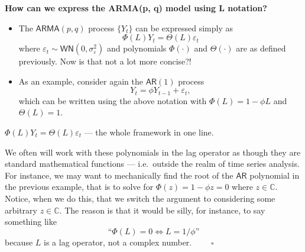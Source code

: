 \documentclass[
  letterpaper,
  DIV=11,
  numbers=noendperiod]{scrartcl}
\newcommand{\slidelabel}[1]{{\color{embernavy}\bfseries\large #1\par\vspace{5pt}}}
\newenvironment{slidefooter}{%
  \par\vspace{7pt}{\color{emberrule}\rule{\linewidth}{0.4pt}}\par\vspace{4pt}%
  \color{emberamber}\itshape\small}{\par}
\begin{document}
\begin{slidebox}

\slidelabel{How can we express the ARMA(p, q) model using L notation?}

\begin{itemize}
\item
  The \(\mathsf{ARMA}(p, q)\) process \(\{Y_t\}\) can be expressed
  simply as \[\Phi(L) Y_t = \Theta(L)\varepsilon_t\] where
  \(\varepsilon_t \sim \mathsf{WN}\left(0, \sigma_\varepsilon^2\right)\)
  and polynomials \(\Phi(\cdot)\) and \(\Theta(\cdot)\) are as defined
  previously. Now is that not a lot more concise?!
\item
  As an example, consider again the \(\mathsf{AR}(1)\) process
  \[Y_t = \phi Y_{t-1} + \varepsilon_t,\] which can be written using the
  above notation with \(\Phi(L) = 1 - \phi L\) and \(\Theta(L) = 1\).
\end{itemize}

\begin{slidefooter}

\(\Phi(L) Y_t = \Theta(L)\varepsilon_t\) --- the whole framework in one
line.

\end{slidefooter}

\end{slidebox}

\begin{tcolorbox}[enhanced jigsaw, arc=.35mm, bottomrule=.15mm, bottomtitle=1mm, breakable, colback=white, colbacktitle=quarto-callout-note-color!10!white, colframe=quarto-callout-note-color-frame, coltitle=black, left=2mm, leftrule=.75mm, opacityback=0, opacitybacktitle=0.6, rightrule=.15mm, title=\textcolor{quarto-callout-note-color}{\faInfo}\hspace{0.5em}{Remark}, titlerule=0mm, toprule=.15mm, toptitle=1mm]

We often will work with these polynomials in the lag operator as though
they are standard mathematical functions --- i.e.~outside the realm of
time series analysis. For instance, we may want to mechanically find the
root of the \(\mathsf{AR}\) polynomial in the previous example, that is
to solve for \(\Phi(z) = 1 - \phi z = 0\) where \(z \in \mathbb{C}\).
Notice, when we do this, that we switch the argument to considering some
arbitrary \(z \in \mathbb{C}\). The reason is that it would be silly,
for instance, to say something like
\[\text{“}\Phi(L) = 0 \iff L = 1/\phi\text{”}\] because \(L\) is a lag
operator, not a complex number. \(\qquad\square\)

\end{tcolorbox}
\end{document}

